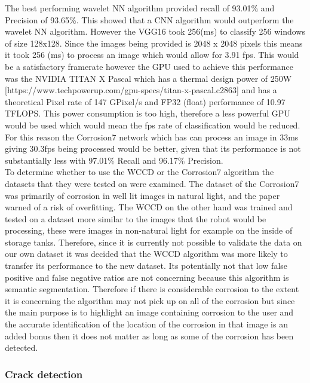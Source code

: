 \documentclass[11pt]{article}		%
\begin{document}
        The best performing wavelet NN algorithm provided recall of 93.01\% and Precision of 93.65\%.  
        This showed that a CNN algorithm would outperform the wavelet NN algorithm. However the VGG16 took 256(ms) to classify 256 windows of size 128x128. 
        Since the images being provided is 2048 x 2048 pixels this means it took 256 (ms) to process an image which would allow for 3.91 fps. 
        This would be a satisfactory framerate however the GPU used to achieve this performance was the NVIDIA TITAN X Pascal which has a thermal design power of 250W [https://www.techpowerup.com/gpu-specs/titan-x-pascal.c2863] and has a theoretical Pixel rate of 147 GPixel/s and FP32 (float) performance of 10.97 TFLOPS. 
        This power consumption is too high, therefore a less powerful GPU would be used which would mean the fps rate of classification would be reduced. 
        For this reason the Corrosion7 network which has can process an image in 33ms giving 30.3fps being processed would be better, given that its performance is not substantially less with 97.01\% Recall and 96.17\% Precision.
        \\
        To determine whether to use the WCCD or the Corrosion7 algorithm the datasets that they were tested on were examined. 
        The dataset of the Corrosion7 was primarily of corrosion in well lit images in natural light, and the paper warned of a risk of overfitting. 
        The WCCD on the other hand was trained and tested on a dataset more similar to the images that the robot would be processing, these were images in non-natural light for example on the inside of storage tanks. 
        Therefore, since it is currently not possible to validate the data on our own dataset it was decided that the WCCD algorithm was more likely to transfer its performance to the new dataset. 
        Its potentially not that low false positive and false negative ratios are not concerning because this algorithm is semantic segmentation. 
        Therefore if there is considerable corrosion to the extent it is concerning the algorithm may not pick up on all of the corrosion but since the main purpose is to highlight an image containing corrosion to the user and the accurate identification of the location of the corrosion in that image is an added bonus then it does not matter as long as some of the corrosion has been detected.
	
		
		\subsubsection{Crack detection}
		
\end{document}
